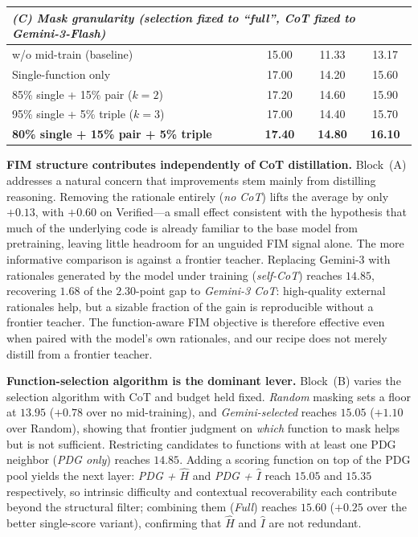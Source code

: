 \begin{table}[t]
\begin{tabular}{lccc}
\midrule
\multicolumn{4}{l}{\emph{(C) Mask granularity (selection fixed to ``full'', CoT fixed to Gemini-3-Flash)}} \\
\midrule
w/o mid-train (baseline)             & 15.00 & 11.33 & 13.17 \\
Single-function only                 & 17.00 & 14.20 & 15.60 \\
85\% single + 15\% pair ($k=2$)       & 17.20 & 14.60 & 15.90 \\
95\% single + 5\% triple ($k=3$)      & 17.00 & 14.40 & 15.70 \\
\textbf{80\% single + 15\% pair + 5\% triple} & \textbf{17.40} & \textbf{14.80} & \textbf{16.10} \\
\bottomrule
\end{tabular}
\end{table}

\textbf{FIM structure contributes independently of CoT distillation.}
Block~(A) addresses a natural concern that improvements stem mainly
from distilling reasoning. Removing the rationale entirely (\emph{no
CoT}) lifts the average by only $+0.13$, with $+0.60$ on Verified---a
small effect consistent with the hypothesis that much of the underlying
code is already familiar to the base model from pretraining, leaving
little headroom for an unguided FIM signal alone. The more
informative comparison is against a frontier teacher.
Replacing Gemini-3 with rationales
generated by the model under training (\emph{self-CoT}) reaches
$14.85$, recovering $1.68$ of the $2.30$-point gap to \emph{Gemini-3
CoT}: high-quality external rationales help, but a sizable fraction of
the gain is reproducible without a frontier teacher. The function-aware
FIM objective is therefore effective even when paired with the model's
own rationales, and our recipe does not merely distill from a frontier
teacher.

\textbf{Function-selection algorithm is the dominant lever.}
Block~(B) varies the selection algorithm with CoT and budget held
fixed. \emph{Random} masking sets a floor at $13.95$ ($+0.78$ over no
mid-training), and \emph{Gemini-selected} reaches $15.05$ ($+1.10$ over
Random), showing that frontier judgment on \emph{which} function to mask
helps but is not sufficient. Restricting candidates to functions with at
least one PDG neighbor (\emph{PDG only}) reaches $14.85$. Adding a
scoring function on top of the PDG pool yields the next layer:
\emph{PDG + $\hat{H}$} and \emph{PDG + $\hat{I}$} reach $15.05$ and
$15.35$ respectively, so intrinsic difficulty and contextual
recoverability each contribute beyond the structural filter; combining
them (\emph{Full}) reaches $15.60$ ($+0.25$ over the better
single-score variant), confirming that $\hat{H}$ and $\hat{I}$ are not
redundant.


